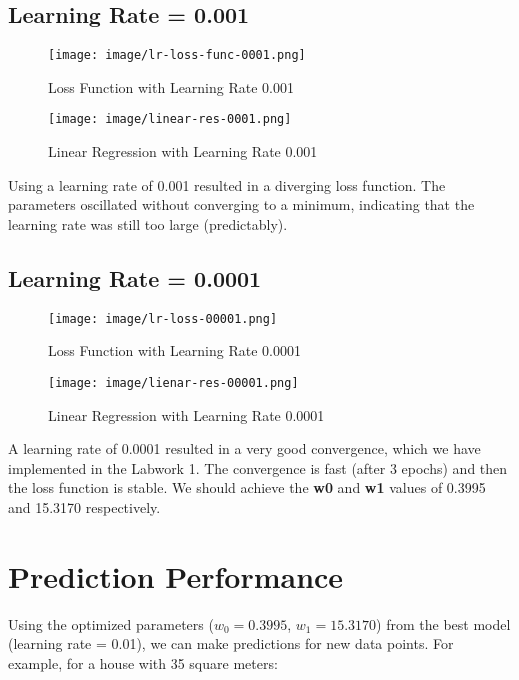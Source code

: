 \documentclass[hidelinks]{report}
\begin{document}
\subsection{Learning Rate = 0.001}
\begin{figure}[H]
    \centering
    \texttt{[image: image/lr-loss-func-0001.png]}
    \caption{Loss Function with Learning Rate 0.001}
    \label{fig:enter-label}
\end{figure}

\begin{figure}[H]
    \centering
    \texttt{[image: image/linear-res-0001.png]}
    \caption{Linear Regression with Learning Rate 0.001}
    \label{fig:enter-label}
\end{figure}

\noindent Using a learning rate of 0.001 resulted in a diverging loss function. The parameters oscillated without converging to a minimum, indicating that the learning rate was still too large (predictably).

\subsection{Learning Rate = 0.0001} 
\begin{figure}[H]
    \centering
    \texttt{[image: image/lr-loss-00001.png]}
    \caption{Loss Function with Learning Rate 0.0001}
    \label{fig:enter-label}
\end{figure}

\begin{figure}[H]
    \centering
    \texttt{[image: image/lienar-res-00001.png]}
    \caption{Linear Regression with Learning Rate 0.0001}
    \label{fig:enter-label}
\end{figure}

\noindent A learning rate of 0.0001 resulted in a very good convergence, which we have implemented in the Labwork 1. The convergence is fast (after 3 epochs) and then the loss function is stable. We should achieve the \textbf{w0} and \textbf{w1} values of 0.3995 and 15.3170 respectively. 

\section{Prediction Performance}
\noindent Using the optimized parameters ($w_0 = 0.3995$, $w_1 = 15.3170$) from the best model (learning rate = 0.01), we can make predictions for new data points. For example, for a house with 35 square meters:
\end{document}
